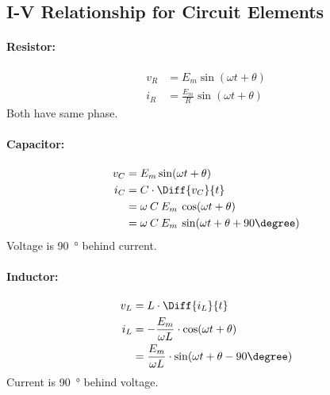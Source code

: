 
\subsection{I-V Relationship for Circuit Elements} %
	\paragraph{Resistor:} %
		\begin{align*}
			v_R &= E_m \sin (\omega t + \theta) \\
			i_R &= \frac{E_m}{R} \sin (\omega t + \theta)
		\end{align*}
		Both have same phase.
	\paragraph{Capacitor:} %
		\begin{align*}
			v_C &= E_m \sin(\omega t + \theta) \\
			i_C &= C \cdot \Diff{v_C}{t} \\
			&= \omega\:C\:E_m\:\cos (\omega t + \theta) \\
			&= \omega\:C\:E_m\:\sin (\omega t + \theta + 90\degree)
		\end{align*}
		Voltage is \SI{90}{\degree} behind current.
	\paragraph{Inductor:} %
		\begin{align*}
			v_L &= L \cdot \Diff{i_L}{t} \\
			i_L &= -\frac{E_m}{\omega L} \cdot \cos(\omega t + \theta) \\
			&= \frac{E_m}{\omega L} \cdot \sin(\omega t + \theta - 90\degree)
		\end{align*}
		Current is \SI{90}{\degree} behind voltage.
